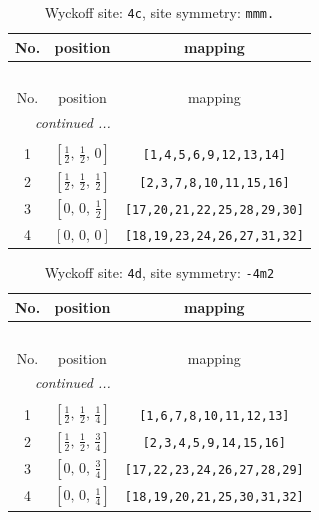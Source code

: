 \documentclass[fleqn,8pt]{jsarticle}
\begin{document}
\renewcommand{\arraystretch}{1.2}
\begin{longtable}{ccc}
\caption{Wyckoff site: {\tt 4c}, site symmetry: {\tt mmm.}}
 \\
 \hline \hline
No. & position & mapping \\ \hline \endfirsthead

\multicolumn{2}{l}{\tablename\ \thetable{}} \\
 \hline \hline
No. & position & mapping \\ \hline \endhead

 \hline \hline
\multicolumn{2}{r}{\footnotesize\it continued ...} \\ \endfoot

 \hline \hline
\multicolumn{2}{r}{} \\ \endlastfoot

1 & $\left[ \frac{1}{2},\, \frac{1}{2},\, 0 \right]$ & {\tt [1,4,5,6,9,12,13,14]} \\ \hline
2 & $\left[ \frac{1}{2},\, \frac{1}{2},\, \frac{1}{2} \right]$ & {\tt [2,3,7,8,10,11,15,16]} \\ \hline
3 & $\left[ 0,\, 0,\, \frac{1}{2} \right]$ & {\tt [17,20,21,22,25,28,29,30]} \\ \hline
4 & $\left[ 0,\, 0,\, 0 \right]$ & {\tt [18,19,23,24,26,27,31,32]} \\
\end{longtable}
\renewcommand{\arraystretch}{1.2}
\begin{longtable}{ccc}
\caption{Wyckoff site: {\tt 4d}, site symmetry: {\tt -4m2}}
 \\
 \hline \hline
No. & position & mapping \\ \hline \endfirsthead

\multicolumn{2}{l}{\tablename\ \thetable{}} \\
 \hline \hline
No. & position & mapping \\ \hline \endhead

 \hline \hline
\multicolumn{2}{r}{\footnotesize\it continued ...} \\ \endfoot

 \hline \hline
\multicolumn{2}{r}{} \\ \endlastfoot

1 & $\left[ \frac{1}{2},\, \frac{1}{2},\, \frac{1}{4} \right]$ & {\tt [1,6,7,8,10,11,12,13]} \\ \hline
2 & $\left[ \frac{1}{2},\, \frac{1}{2},\, \frac{3}{4} \right]$ & {\tt [2,3,4,5,9,14,15,16]} \\ \hline
3 & $\left[ 0,\, 0,\, \frac{3}{4} \right]$ & {\tt [17,22,23,24,26,27,28,29]} \\ \hline
4 & $\left[ 0,\, 0,\, \frac{1}{4} \right]$ & {\tt [18,19,20,21,25,30,31,32]} \\
\end{longtable}
\end{document}
